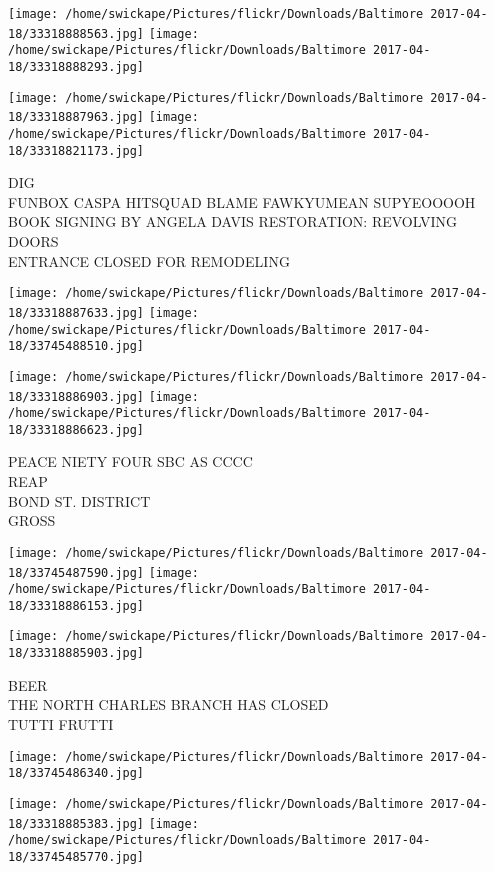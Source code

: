 \documentclass[10pt,letterpaper]{article}
\begin{document}
\texttt{[image: /home/swickape/Pictures/flickr/Downloads/Baltimore 2017-04-18/33318888563.jpg]}
\texttt{[image: /home/swickape/Pictures/flickr/Downloads/Baltimore 2017-04-18/33318888293.jpg]}

\texttt{[image: /home/swickape/Pictures/flickr/Downloads/Baltimore 2017-04-18/33318887963.jpg]}
\texttt{[image: /home/swickape/Pictures/flickr/Downloads/Baltimore 2017-04-18/33318821173.jpg]}

DIG\\
FUNBOX CASPA HITSQUAD BLAME FAWKYUMEAN SUPYEOOOOH\\
BOOK SIGNING BY ANGELA DAVIS RESTORATION: REVOLVING DOORS\\
ENTRANCE CLOSED FOR REMODELING
\pagebreak

\texttt{[image: /home/swickape/Pictures/flickr/Downloads/Baltimore 2017-04-18/33318887633.jpg]}
\texttt{[image: /home/swickape/Pictures/flickr/Downloads/Baltimore 2017-04-18/33745488510.jpg]}

\texttt{[image: /home/swickape/Pictures/flickr/Downloads/Baltimore 2017-04-18/33318886903.jpg]}
\texttt{[image: /home/swickape/Pictures/flickr/Downloads/Baltimore 2017-04-18/33318886623.jpg]}

PEACE NIETY FOUR SBC AS CCCC\\
REAP\\
BOND ST. DISTRICT\\
GROSS
\pagebreak

\texttt{[image: /home/swickape/Pictures/flickr/Downloads/Baltimore 2017-04-18/33745487590.jpg]}
\texttt{[image: /home/swickape/Pictures/flickr/Downloads/Baltimore 2017-04-18/33318886153.jpg]}

\texttt{[image: /home/swickape/Pictures/flickr/Downloads/Baltimore 2017-04-18/33318885903.jpg]}

BEER\\
THE NORTH CHARLES BRANCH HAS CLOSED\\
TUTTI FRUTTI
\pagebreak

\texttt{[image: /home/swickape/Pictures/flickr/Downloads/Baltimore 2017-04-18/33745486340.jpg]}

\vspace{0.25in}
\texttt{[image: /home/swickape/Pictures/flickr/Downloads/Baltimore 2017-04-18/33318885383.jpg]}
\texttt{[image: /home/swickape/Pictures/flickr/Downloads/Baltimore 2017-04-18/33745485770.jpg]}
\end{document}
